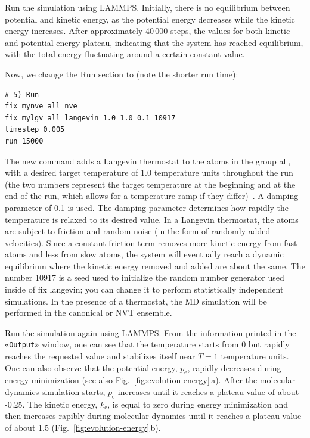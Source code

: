 \documentclass[9pt,tutorial]{livecoms}
\newcommand{\lmpcmd}[1]{\hspace{0pt}\colorbox{listing}{\textcolor{command}{\small{#1}}}\hspace{0pt}} %
\newcommand{\guicmd}[1]{\textcolor{command}{\texttt{«#1»}}} %
\begin{document}
Run the simulation using LAMMPS.  Initially, there is no equilibrium
between potential and kinetic energy, as the potential energy
decreases while the kinetic energy increases.  After approximately
40\,000 steps, the values for both kinetic and potential energy
plateau, indicating that the system has reached equilibrium, with
the total energy fluctuating around a certain constant value.

Now, we change the \lmpcmd{Run} section to (note the shorter run time):
\begin{lstlisting}
# 5) Run
fix mynve all nve
fix mylgv all langevin 1.0 1.0 0.1 10917
timestep 0.005
run 15000
\end{lstlisting}
The new command adds a Langevin thermostat to the atoms in the group
\lmpcmd{all}, with a desired target temperature of 1.0 temperature units
throughout the run (the two numbers represent the target temperature at the beginning
and at the end of the run, which allows for a temperature ramp if
they differ)~\cite{schneider1978molecular}.  A \lmpcmd{damping}
parameter of 0.1 is used.  The \lmpcmd{damping} parameter determines how
rapidly the temperature is relaxed to its desired value.  In a Langevin
thermostat, the atoms are subject to friction and random noise (in the form
of randomly added velocities).  Since a constant friction term removes
more kinetic energy from fast atoms and less from slow atoms, the system
will eventually reach a dynamic equilibrium where the kinetic energy
removed and added are about the same.  The number 10917 is a
seed used to initialize the random number generator used inside of
\lmpcmd{fix langevin}; you can change it to perform statistically
independent simulations.  In the presence of a thermostat, the MD simulation
will be performed in the canonical or NVT ensemble.

Run the simulation again using LAMMPS.  From the information
printed in the \guicmd{Output} window, one can see that the temperature
starts from 0 but rapidly reaches the requested value and
stabilizes itself near $T=1$ temperature units.  One can also observe that
the potential energy, $p_\text{e}$, rapidly decreases during energy
minimization (see also Fig.~\ref{fig:evolution-energy}\,a).  After
the molecular dynamics simulation starts, $p_\text{e}$ increases until
it reaches a plateau value of about -0.25.  The kinetic energy,
$k_\text{e}$, is equal to zero during energy minimization and then
increases rapibly during molecular dynamics until it reaches
a plateau value of about 1.5 (Fig.~\ref{fig:evolution-energy}\,b).
\end{document}
